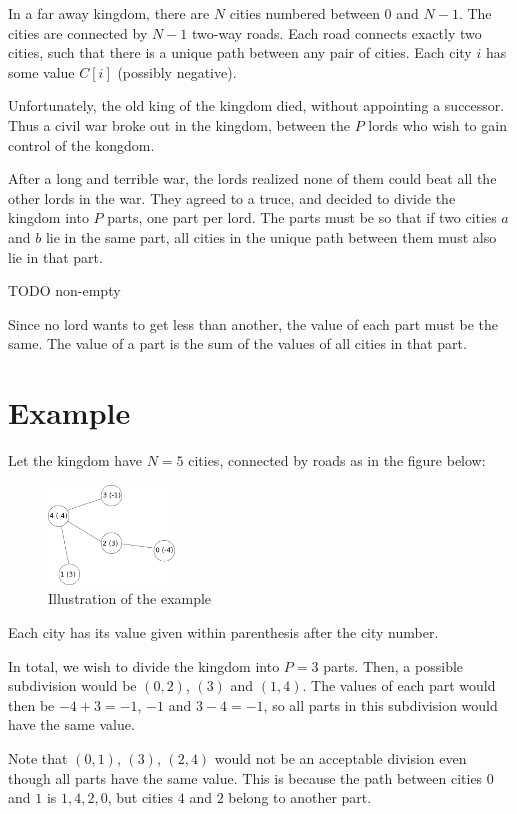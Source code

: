 \newcommand\version{v2}
In a far away kingdom, there are $N$ cities numbered between $0$ and $N - 1$.
The cities are connected by $N - 1$ two-way roads.
Each road connects exactly two cities, such that there is a unique path between any pair of cities. Each city $i$ has some value $C[i]$ (possibly negative).

Unfortunately, the old king of the kingdom died, without appointing a successor. Thus a civil war broke out in the kingdom, between the $P$ lords who wish to gain control of the kongdom.

After a long and terrible war, the lords realized none of them could beat all the other lords in the war. They agreed to a truce, and decided to divide the kingdom into $P$ parts, one part per lord. The parts must be so that if two cities $a$ and $b$ lie in the same part, all cities in the unique path between them must also lie in that part.

TODO non-empty

Since no lord wants to get less than another, the value of each part must be the same. The value of a part is the sum of the values of all cities in that part.

\section*{Example}
Let the kingdom have $N = 5$ cities, connected by roads as in the figure below:
\begin{figure}[h!]
  \centering
  \includegraphics[width=0.3\textwidth]{sample.png}
  \caption{Illustration of the example}
\end{figure}
Each city has its value given within parenthesis after the city number.

In total, we wish to divide the kingdom into $P = 3$ parts.
Then, a possible subdivision would be $(0, 2)$, $(3)$ and $(1, 4)$.
The values of each part would then be $-4 + 3 = -1$, $-1$ and $3 - 4 = -1$,
so all parts in this subdivision would have the same value.

Note that $(0, 1)$, $(3)$, $(2, 4)$ would not be an acceptable division even
though all parts have the same value. This is because the path between cities
$0$ and $1$ is $1, 4, 2, 0$, but cities $4$ and $2$ belong to another part.

